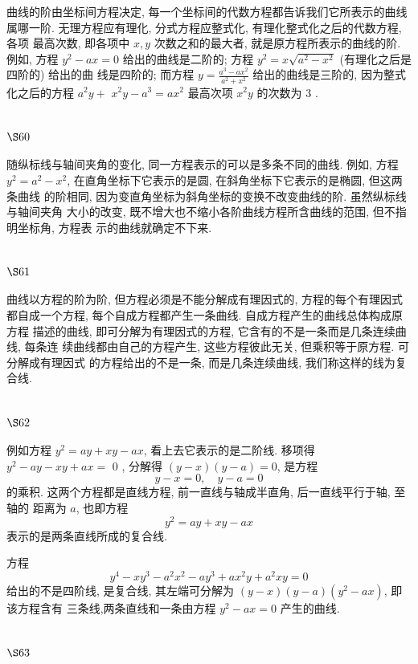 曲线的阶由坐标间方程决定, 每一个坐标间的代数方程都告诉我们它所表示的曲线 属哪一阶. 无理方程应有理化, 分式方程应整式化, 有理化整式化之后的代数方程, 各项 最高次数, 即各项中 $x, y$ 次数之和的最大者, 就是原方程所表示的曲线的阶. 例如, 方程 $y^{2}-a x=0$ 给出的曲线是二阶的; 方程 $y^{2}=x \sqrt{a^{2}-x^{2}}$ (有理化之后是四阶的) 给出的曲 线是四阶的; 而方程 $y=\frac{a^{3}-a x^{2}}{a^{2}+x^{2}}$ 给出的曲线是三阶的, 因为整式化之后的方程 $a^{2} y+$ $x^{2} y-a^{3}=a x^{2}$ 最高次项 $x^{2} y$ 的次数为 3 .

\section{$\S 60$}

随纵标线与轴间夹角的变化, 同一方程表示的可以是多条不同的曲线. 例如, 方程 $y^{2}=a^{2}-x^{2}$, 在直角坐标下它表示的是圆, 在斜角坐标下它表示的是椭圆, 但这两条曲线 的阶相同, 因为变直角坐标为斜角坐标的变换不改变曲线的阶. 虽然纵标线与轴间夹角 大小的改变, 既不增大也不缩小各阶曲线方程所含曲线的范围, 但不指明坐标角, 方程表 示的曲线就确定不下来.

\section{$\S 61$}

曲线以方程的阶为阶, 但方程必须是不能分解成有理因式的, 方程的每个有理因式 都自成一个方程, 每个自成方程都产生一条曲线. 自成方程产生的曲线总体构成原方程 描述的曲线, 即可分解为有理因式的方程, 它含有的不是一条而是几条连续曲线, 每条连 续曲线都由自己的方程产生, 这些方程彼此无关, 但乘积等于原方程. 可分解成有理因式 的方程给出的不是一条, 而是几条连续曲线, 我们称这样的线为复合线.

\section{$\S 62$}

例如方程 $y^{2}=a y+x y-a x$, 看上去它表示的是二阶线. 移项得 $y^{2}-a y-x y+a x=$ 0 , 分解得 $(y-x)(y-a)=0$, 是方程
\[
y-x=0, \quad y-a=0
\]
的乘积. 这两个方程都是直线方程, 前一直线与轴成半直角, 后一直线平行于轴, 至轴的 距离为 $a$, 也即方程 
\[
y^{2}=a y+x y-a x
\]
表示的是两条直线所成的复合线.

方程
\[
y^{4}-x y^{3}-a^{2} x^{2}-a y^{3}+a x^{2} y+a^{2} x y=0
\]
给出的不是四阶线, 是复合线, 其左端可分解为 $(y-x)(y-a)\left(y^{2}-a x\right)$, 即该方程含有 三条线,两条直线和一条由方程 $y^{2}-a x=0$ 产生的曲线.

\section{$\S 63$}

